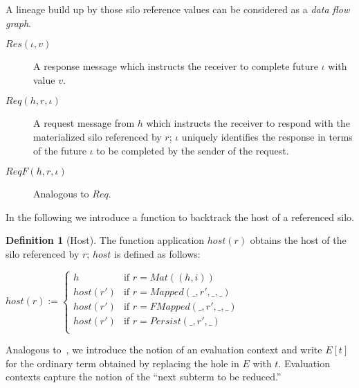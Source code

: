 \documentclass{article}
\theoremstyle{definition}
\newtheorem{defn}{Definition}[section]
\begin{document}
A lineage build up by those silo reference values can be considered as a {\emph{data flow graph}}\cite{???}. %

\begin{description}
\item[$Res(\iota, v)$] A response message which instructs the receiver to complete future $\iota$ with value $v$.

\item[$Req(h, r, \iota)$] A request message from $h$ which instructs the receiver to respond with the materialized silo referenced by $r$; $\iota$ uniquely identifies the response in terms of the future $\iota$ to be completed by the sender of the request.

\item[$ReqF(h, r, \iota)$] Analogous to $Req$.
\end{description}

In the following we introduce a function to backtrack the host of a referenced silo.

\begin{defn}[Host]
  The function application $host(r)$ obtains the host of the silo referenced by $r$; $host$ is defined as follows:
  
  $host(r) := \begin{cases}
    h        & \text{if } r = Mat((h, i)) \\
    host(r') & \text{if } r = Mapped(\_, r', \_, \_) \\
    host(r') & \text{if } r = FMapped(\_, r', \_, \_) \\
    host(r') & \text{if } r = Persist(\_, r', \_) \\
    \end{cases}$
\end{defn}

Analogous to~\cite{TAPL}, we introduce the notion of an evaluation context and write $E[t]$ for the ordinary term obtained by replacing the hole in $E$ with $t$. Evaluation contexts capture the notion of the ``next subterm to be reduced.''
\end{document}
